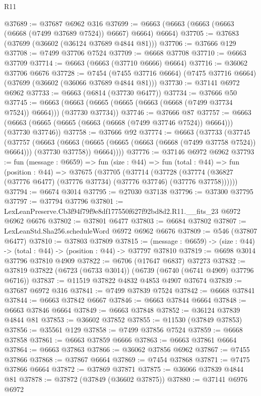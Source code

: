 \begin{lexlean}{R11}
\begin{coremodule}
@37689 := @37687 @6962 @316
@37699 := @6663 (@6663 (@6663 (@6663 (@6668 (@7499 @37689 @7524)) @6667) @6664) @6664)
@37705 := @37683 (@37699 (@36602 (@36124 @37689 @4844 @81)))
@37706 := @37666 @129
@37708 := @7499 @37706 @7524
@37709 := @6668 @37708
@37710 := @6663 @37709
@37714 := @6663 (@6663 (@37710 @6666) @6664)
@37716 := @36062 @37706 @6676
@37728 := @7454
    (@7455 @37716 @6664)
    (@7475 @37716 @6664)
    (@37699 (@36602 (@36066 @37689 @4844 @81)))
@37730 := @37141 @6972 @6962
@37733 := @6663 (@6814 (@37730 @6477))
@37734 := @37666 @50
@37745 := @6663 (@6663 (@6665 (@6665 (@6663 (@6668 (@7499 @37734 @7524)) @6664))) (@37730 @37734))
@37746 := @37666 @87
@37757 := @6663 (@6663 (@6665 (@6665 (@6663 (@6668 (@7499 @37746 @7524)) @6664))) (@37730 @37746))
@37758 := @37666 @92
@37774 := @6663
    (@37733
      (@37745
        (@37757
          (@6663
            (@6663 (@6665 (@6665 (@6663 (@6668 (@7499 @37758 @7524)) @6664))) (@37730 @37758))
            @6664))))
@37776 := @37146 @6972 @6962
@37793 := fun (message : @6659) =>
  fun (size : @44) =>
  fun (total : @44) =>
  fun (position : @44) =>
  @37675
    (@37705
      (@37714
        (@37728 (@37774 (@36827 (@37776 @6477) (@37776 @37734) (@37776 @37746) (@37776 @37758))))))
@37794 := @6674 @3014
@37795 := @27030 @37138
@37796 := @37300 @37795
@37797 := @37794 @37796
@37801 := LexLeanPreserve.Cb3f94f79f9e8df177550f627f92bd8d2.R11.__fits_23 @6972 @6962 @6676
@37802 := @37801 @6477
@37803 := @6684 @37802
@37807 := LexLeanStd.Sha256.scheduleWord @6972 @6962 @6676
@37809 := @546 (@37807 @6477)
@37810 := @37803 @37809
@37815 := (message : @6659) -> (size : @44) -> (total : @44) -> (position : @44) -> @37797 @37810
@37819 := @6698 @3014 @37796 @37810 @4909
@37822 := @6706 (@17647 @6837) @37273
@37832 := @37819 @37822 (@6723 (@6733 @3014)) (@6739 (@6740 (@6741 @4909) @37796 @6716))
@37837 := @11519 @37822 @4832 @4853 @4907 @37674
@37839 := @37687 @6972 @316
@37841 := @7499 @37839 @7524
@37842 := @6668 @37841
@37844 := @6663 @37842 @6667
@37846 := @6663 @37844 @6664
@37848 := @6663 @37846 @6664
@37849 := @6663 @37848
@37852 := @36124 @37839 @4844 @81
@37853 := @36602 @37852
@37855 := @11530 (@37849 @37853)
@37856 := @35561 @129
@37858 := @7499 @37856 @7524
@37859 := @6668 @37858
@37861 := @6663 @37859 @6666
@37863 := @6663 @37861 @6664
@37864 := @6663 @37863
@37866 := @36062 @37856 @6962
@37867 := @7455 @37866
@37868 := @37867 @6664
@37869 := @7454 @37868
@37871 := @7475 @37866 @6664
@37872 := @37869 @37871
@37875 := @36066 @37839 @4844 @81
@37878 := @37872 (@37849 (@36602 @37875))
@37880 := @37141 @6976 @6972

\end{coremodule}
\end{lexlean}
